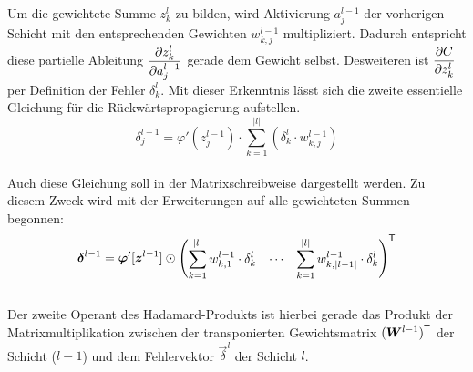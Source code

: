 \begin{appendices}
\begin{equation}
\end{equation}
\\
Um die gewichtete Summe $z_k^l$ zu bilden, wird
Aktivierung $a_j^{l-1}$ der vorherigen Schicht mit den entsprechenden Gewichten
$w_{k,j}^{l-1}$ multipliziert.
Dadurch entspricht diese partielle Ableitung $\displaystyle\frac{\partial z_k^l}{\partial a_j^{l-1}}$ gerade dem
Gewicht selbst. Desweiteren ist $\displaystyle\frac{\partial C}{\partial z_k^l}$ per Definition der
Fehler $\delta_k^l$. Mit dieser Erkenntnis lässt sich die zweite essentielle
Gleichung  für die Rückwärtspropagierung aufstellen.
\\
\begin{equation}\tag{RP2}\label{eq:RP2}
  \delta_j^{l-1} = \varphi'(z_j^{l-1}) \cdot \sum_{k=1}^{|l|} \left( \delta_k^l \cdot w_{k,j}^{l-1} \right)
\end{equation}
\\
Auch diese Gleichung soll in der Matrixschreibweise dargestellt werden. Zu
diesem Zweck wird mit der Erweiterungen auf alle gewichteten Summen begonnen:
\\
\begin{equation*}
  \bm{\delta}^{l-1} = \bm{\varphi}'[\bm{z}^{l-1}] \odot \begin{pmatrix} \displaystyle\sum_{k=1}^{|l|} w_{k,1}^{l-1} \cdot \delta_k^l & \cdots & \displaystyle\sum_{k=1}^{|l|} w_{k,|l-1|}^{l-1} \cdot \delta_k^l \end{pmatrix}^{\mathsf{T}}
\end{equation*}
\\
Der zweite Operant des Hadamard-Produkts ist hierbei gerade das Produkt der
Matrixmultiplikation zwischen
der transponierten Gewichtsmatrix $(\bm{W}^{l-1})^{\mathsf{T}}$ der Schicht ($l-1$)
und dem Fehlervektor $\vec{\delta}^l$ der Schicht $l$.


\end{appendices}
